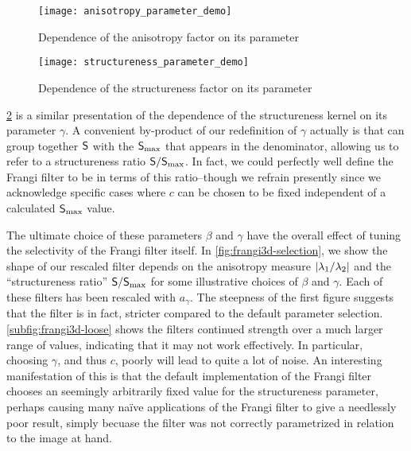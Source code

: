 \begin{figure}[t] \centering
  \texttt{[image: anisotropy\_parameter\_demo]}\\[12pt]
  \caption{Dependence of the anisotropy factor on its parameter}
  \label{fig:anisotropy-parameter-demo}
\end{figure}

\begin{figure}[t] \centering
  \texttt{[image: structureness\_parameter\_demo]}\\[12pt]
  \caption{Dependence of the structureness factor on its parameter}
  \label{fig:structureness-parameter-demo}
\end{figure}

\cref{fig:structureness-parameter-demo} is a similar presentation of the dependence of the structureness kernel on its parameter $\gamma$.
A convenient by-product of our redefinition of $\gamma$ actually is that can group together $\mathsf{S}$ with the $\mathsf{S}_{\max}$ that appears in the denominator, allowing us to refer to a structureness ratio $\mathsf{S}/\mathsf{S}_{\max}$. In fact, we could perfectly well define the Frangi filter to be in terms of this ratio--though we refrain presently since we acknowledge specific cases where $c$ can be chosen to be fixed independent of a calculated $\mathsf{S}_{\max}$ value.


The ultimate choice of these parameters $\beta$ and $\gamma$ have the overall effect of tuning the selectivity of the Frangi filter itself. In \cref{fig:frangi3d-selection}, we show the shape of our rescaled filter depends on the anisotropy measure $\vert\lambda_1 / \lambda_2\vert$ and the ``structureness ratio'' $\mathsf{S}/\mathsf{S}_{\max}$ for some illustrative choices of $\beta$ and $\gamma$. Each of these filters has been rescaled with $a_\gamma$. The steepness of the first figure suggests that the filter is in fact, stricter compared to the default parameter selection. \cref{subfig:frangi3d-loose} shows the filters continued strength over a much larger range of values, indicating that it may not work effectively. In particular, choosing $\gamma$, and thus $c$, poorly will lead to quite a lot of noise.
An interesting manifestation of this is that the default implementation of the Frangi filter \autocite{scipy} chooses an seemingly arbitrarily fixed value for the structureness parameter, perhaps causing many na\"ive applications of the Frangi filter to give a needlessly poor result, simply becuase the filter was not correctly parametrized in relation to the image at hand.

